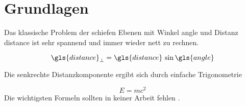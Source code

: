 
\chapter{Grundlagen}
Das klassische Problem der schiefen Ebenen mit Winkel \gls{angle} und Distanz
\gls{distance} ist sehr spannend und immer wieder nett zu rechnen.

\begin{equation}
  \gls{distance}_\perp = \gls{distance} \, \sin{\gls{angle}}
  \label{eq:perpendicular}
\end{equation}

Die senkrechte Distanzkomponente ergibt sich durch einfache Trigonometrie

\begin{equation}
  E=m c^2
  \label{eq:longTongue}
\end{equation}
Die wichtigsten Formeln sollten in keiner Arbeit fehlen .

\Blindtext[4][2]
